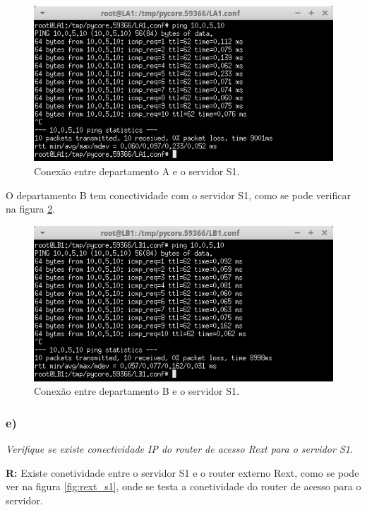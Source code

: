 \documentclass{llncs}
\begin{document}
\begin{figure}[H]
\begin{center}
\includegraphics[scale=0.50]{LA1_S1.png} 
\end{center}
\caption{\label{fig:la1_s1} Conexão entre departamento A e o servidor S1.}
\end{figure} 

O departamento B tem conectividade com o servidor S1, como se pode verificar na figura \ref{fig:lb1_s1}.

\begin{figure}[H]
\begin{center}
\includegraphics[scale=0.50]{LB1_S1.png} 
\end{center}
\caption{\label{fig:lb1_s1} Conexão entre departamento B e o servidor S1.}
\end{figure} 

\subsubsection{e)}
\emph{Verifique  se  existe  conectividade IP do router de acesso Rext para o servidor S1.}
\\ \par
\textbf{R:} Existe conetividade entre o servidor S1 e o router externo Rext, como se pode ver na figura \ref{fig:rext_s1}, onde se testa a conetividade do router de acesso para o servidor.
\end{document}
